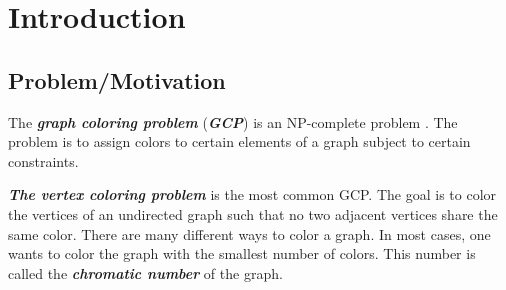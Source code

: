 \documentclass[12pt,a4paper,twoside]{scrartcl}
\numberwithin{equation}{section}
\begin{document}
\vfill\vfill\vfill
\clearpage


\pagestyle{plain}
  
\renewcommand\sectionmark[1]{\markboth{\thesection\quad\MakeUppercase{#1}}{\thesection\quad\MakeUppercase{#1}}}
\renewcommand\subsectionmark[1]{\markright{\thesubsection\quad\MakeUppercase{#1}}}


\tableofcontents
\afterpage{\null\newpage}
\clearpage

\pagestyle{normal}

\section{Introduction}
\subsection{Problem/Motivation}The \emph{\textbf{graph coloring problem}}
(\emph{\textbf{GCP}}) \cite{kubale2004graph} is an NP-complete problem \cite{gary1979computers}. The problem is to assign colors to certain elements of a graph subject to certain constraints.

\emph{\textbf{The vertex coloring problem}} is the most common GCP. The goal is to color the vertices of an undirected graph such that no two adjacent vertices share the same color. There are many different ways to color a graph. In most cases, one wants to color the graph with the smallest number of colors. This number is called the \emph{\textbf{chromatic number}} of the graph.
\end{document}

